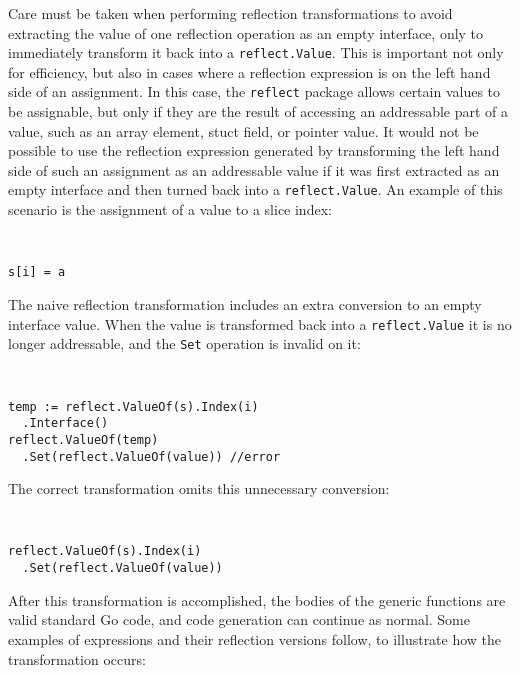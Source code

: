 \documentclass[letterpaper,11pt]{article}
\begin{document}
Care must be taken when performing reflection transformations to avoid extracting the value of one reflection operation as an empty interface, only to immediately transform it back into a \texttt{reflect.Value}. This is important not only for efficiency, but also in cases where a reflection expression is on the left hand side of an assignment. In this case, the \texttt{reflect} package allows certain values to be assignable, but only if they are the result of accessing an addressable part of a value, such as an array element, stuct field, or pointer value. It would not be possible to use the reflection expression generated by transforming the left hand side of such an assignment as an addressable value if it was first extracted as an empty interface and then turned back into a \texttt{reflect.Value}. An example of this scenario is the assignment of a value to a slice index:
{ \tt \small
\begin{verbatim}
s[i] = a
\end{verbatim}
}
The naive reflection transformation includes an extra conversion to an empty interface value. When the value is transformed back into a \texttt{reflect.Value} it is no longer addressable, and the \texttt{Set} operation is invalid on it:
{ \tt \small
\begin{verbatim}
temp := reflect.ValueOf(s).Index(i)
  .Interface()
reflect.ValueOf(temp)
  .Set(reflect.ValueOf(value)) //error
\end{verbatim}
}
The correct transformation omits this unnecessary conversion:
{ \tt \small
\begin{verbatim}
reflect.ValueOf(s).Index(i)
  .Set(reflect.ValueOf(value))
\end{verbatim}
}

After this transformation is accomplished, the bodies of the generic functions are valid standard Go code, and code generation can continue as normal. Some examples of expressions and their reflection versions follow, to illustrate how the transformation occurs:
\end{document}
